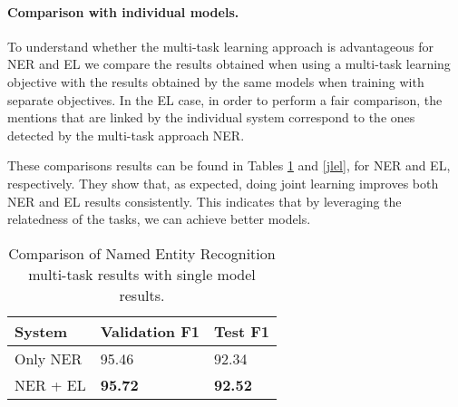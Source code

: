 \documentclass[11pt,a4paper,dvipsnames]{article}
\begin{document}
{
\renewcommand{\arraystretch}{1.2}
\begin{table}[h!]
\begin{centering}\small
{}
\par\end{centering}
\centering{}
\caption{End-to-end EL results on validation and test sets in AIDA/CoNLL.}
\label{el_results}
\end{table}
}

\paragraph{Comparison with individual models.} To understand whether the multi-task learning approach is advantageous for NER and EL we compare the results obtained when using a multi-task learning objective with the results obtained by the same models when training with separate objectives. In the EL case, in order to perform a fair comparison, the mentions that are linked by the individual system correspond to the ones detected by the multi-task approach NER. 

These comparisons results can be found in Tables \ref{jlner} and \ref{jlel}, for NER and EL, respectively. They show that, as expected, doing joint learning improves both NER and EL results consistently. This indicates that by leveraging the relatedness of the tasks, we can achieve better models. 

{
\renewcommand{\arraystretch}{1.2}
\begin{table}[h!]
\begin{centering}\small
\begin{tabular}{l@{\hskip 0.8cm}p{21mm}p{13mm}}
\hline 
System &  Validation F1 & Test F1 \tabularnewline
\hline 
Only NER & 95.46 & 92.34  \tabularnewline

NER + EL & \textbf{95.72} & \textbf{92.52} \tabularnewline
\hline 
\end{tabular}
\par\end{centering}
\centering{}
\caption{Comparison of Named Entity Recognition multi-task results with single model results.}
\label{jlner}
\end{table}
}
\end{document}
